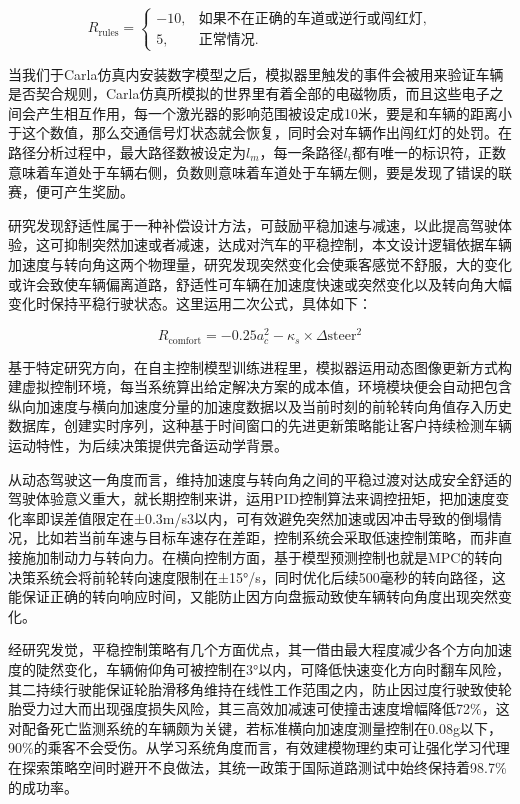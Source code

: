 \begin{equation}
	R_{\text{rules}} = 
	\begin{cases} 
		-10, & \text{如果不在正确的车道或逆行或闯红灯}, \\ 
		5,   & \text{正常情况}. 
	\end{cases}
\end{equation}

当我们于Carla仿真内安装数字模型之后，模拟器里触发的事件会被用来验证车辆是否契合规则，Carla仿真所模拟的世界里有着全部的电磁物质，而且这些电子之间会产生相互作用，每一个激光器的影响范围被设定成10米，要是和车辆的距离小于这个数值，那么交通信号灯状态就会恢复，同时会对车辆作出闯红灯的处罚。在路径分析过程中，最大路径数被设定为$l_m$，每一条路径$l_i$都有唯一的标识符，正数意味着车道处于车辆右侧，负数则意味着车道处于车辆左侧，要是发现了错误的联赛，便可产生奖励。

研究发现舒适性属于一种补偿设计方法，可鼓励平稳加速与减速，以此提高驾驶体验，这可抑制突然加速或者减速，达成对汽车的平稳控制，本文设计逻辑依据车辆加速度与转向角这两个物理量，研究发现突然变化会使乘客感觉不舒服，大的变化或许会致使车辆偏离道路，舒适性可车辆在加速度快速或突然变化以及转向角大幅变化时保持平稳行驶状态。这里运用二次公式，具体如下：

\begin{equation}
	R_{\text{comfort}} = -0.25 a_c^2 - \kappa_s \times \Delta \text{steer}^2
\end{equation}

基于特定研究方向，在自主控制模型训练进程里，模拟器运用动态图像更新方式构建虚拟控制环境，每当系统算出给定解决方案的成本值，环境模块便会自动把包含纵向加速度与横向加速度分量的加速度数据以及当前时刻的前轮转向角值存入历史数据库，创建实时序列，这种基于时间窗口的先进更新策略能让客户持续检测车辆运动特性，为后续决策提供完备运动学背景。

从动态驾驶这一角度而言，维持加速度与转向角之间的平稳过渡对达成安全舒适的驾驶体验意义重大，就长期控制来讲，运用PID控制算法来调控扭矩，把加速度变化率即误差值限定在±0.3m/s3以内，可有效避免突然加速或因冲击导致的倒塌情况，比如若当前车速与目标车速存在差距，控制系统会采取低速控制策略，而非直接施加制动力与转向力。在横向控制方面，基于模型预测控制也就是MPC的转向决策系统会将前轮转向速度限制在±15°/s，同时优化后续500毫秒的转向路径，这能保证正确的转向响应时间，又能防止因方向盘振动致使车辆转向角度出现突然变化。

经研究发觉，平稳控制策略有几个方面优点，其一借由最大程度减少各个方向加速度的陡然变化，车辆俯仰角可被控制在3°以内，可降低快速变化方向时翻车风险，其二持续行驶能保证轮胎滑移角维持在线性工作范围之内，防止因过度行驶致使轮胎受力过大而出现强度损失风险，其三高效加减速可使撞击速度增幅降低72\%，这对配备死亡监测系统的车辆颇为关键，若标准横向加速度测量控制在0.08g以下，90\%的乘客不会受伤。从学习系统角度而言，有效建模物理约束可让强化学习代理在探索策略空间时避开不良做法，其统一政策于国际道路测试中始终保持着98.7\%的成功率。

